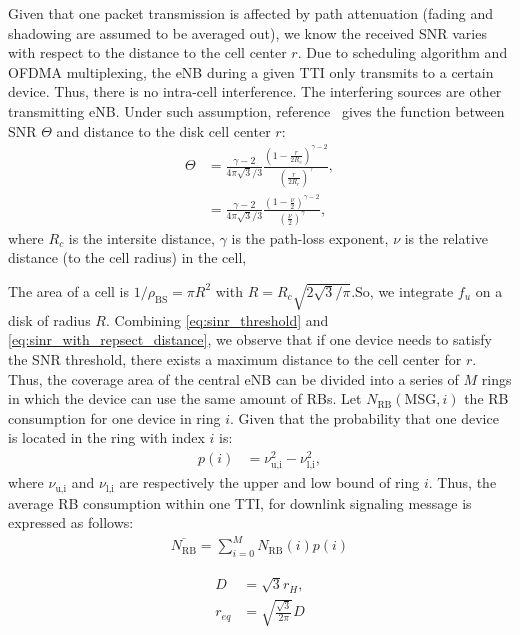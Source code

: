 Given that one packet transmission is affected by path attenuation (fading and shadowing are assumed to be averaged out), we know the received SNR varies with respect to the distance to the cell center $r$. Due to scheduling algorithm and OFDMA multiplexing, the eNB during a given TTI only transmits to a certain device. Thus, there is no intra-cell interference. The interfering sources are other transmitting eNB. Under such assumption, reference~\cite{kelif2010fluid} gives the function between SNR $\Theta$ and distance to the disk cell center $r$:
\begin{align}
	\label{eq:sinr_with_repsect_distance}
	\Theta &= \frac{\gamma - 2}{4\pi\sqrt{3}/3} 
	\frac{(1 -\frac{r}{2R_c})^{\gamma - 2}}{(\frac{r}{2R_c})^{\gamma}}, \nonumber\\
	&= \frac{\gamma - 2}{4\pi\sqrt{3}/3} 
	\frac{(1 -\frac{\nu}{2})^{\gamma - 2}}{(\frac{\nu}{2})^{\gamma}},
\end{align}
where $R_c$ is the intersite distance, $\gamma$ is the path-loss exponent, $\nu$ is the relative distance (to the cell radius) in the cell, 


The area of a cell is $1/\rho_{\text{BS}} = \pi R^2$ with $R = R_c \sqrt{2\sqrt{3}/\pi}$.So, we integrate $f_u$ on a disk of radius $R$.
Combining \eqref{eq:sinr_threshold} and \eqref{eq:sinr_with_repsect_distance}, we observe that if one device needs to satisfy the SNR threshold, there exists a maximum distance to the cell center for $r$. Thus, the coverage area of the central eNB can be divided into a series of $M$ rings in which the device can use the same amount of RBs.
Let $N_{\text{RB}}(\text{MSG}, i)$ the RB consumption for one device in ring $i$. Given that the probability that one device is located in the ring with index $i$ is:
\begin{align}
	p(i) 
	&= \nu_{\text{u,i}}^{2} - \nu_{\text{l,i}}^{2},
\end{align}
where $\nu_{\text{u,i}}$ and $\nu_{\text{l,i}}$ are respectively the upper and low bound of ring $i$.
Thus, the average RB consumption within one TTI, for downlink signaling message is expressed as follows:
\begin{align}
	\overline{N_{\text{RB}}} = \sum_{i=0}^{M} N_{\text{RB}}(i) p(i)
\end{align}




\begin{align}
	D &= \sqrt{3} r_{H}, \\
	r_{eq} &= \sqrt{\frac{\sqrt{3}}{2\pi}} D
\end{align}


